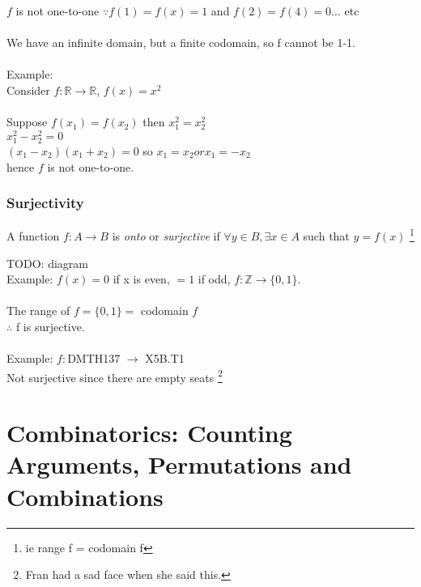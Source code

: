 $f$ is not one-to-one $\because f(1) = f(x) = 1$ and $f(2) = f(4) = 0\ldots$ etc \\
\\
We have an infinite domain, but a finite codomain, so f cannot be 1-1. \\
\\
Example: \\
Consider $f: \mathbb{R} \to \mathbb{R}$, $f(x) = x^2$ \\
\\
Suppose $f(x_1) = f(x_2)$ then $x_1^{2} = x_2^{2}$ \\
$x_1^2 - x_2^2 = 0$ \\
$(x_1 - x_2)(x_1 + x_2) = 0$ so $x_1 = x_2 or x_1 = -x_2$ \\
hence $f$ is not one-to-one. \\

\subsubsection{Surjectivity}
A function $f: A \to B $ is \emph{onto} or \emph{surjective} if $\forall y \in B, \exists x \in A$
such that $y = f(x)$ \footnote{ie range f = codomain f}

TODO: diagram \\
Example: $f(x) = 0$ if x is even, $=1$ if odd, $f: \mathbb{Z} \to \{0,1\}$. \\
\\
The range of $f = \{0,1\} = $ codomain $f$ \\
$\therefore$ f is surjective. \\
\\
Example: $f:$DMTH137 $\to$ X5B.T1 \\
Not surjective since there are empty seats \footnote{Fran had a sad face when she said this.}

\section{Combinatorics: Counting Arguments, Permutations and Combinations}
\label{sec:Combinatorics}

